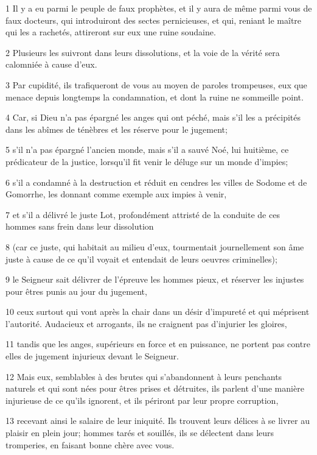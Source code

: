 \par 1 Il y a eu parmi le peuple de faux prophètes, et il y aura de même parmi vous de faux docteurs, qui introduiront des sectes pernicieuses, et qui, reniant le maître qui les a rachetés, attireront sur eux une ruine soudaine.
\par 2 Plusieurs les suivront dans leurs dissolutions, et la voie de la vérité sera calomniée à cause d'eux.
\par 3 Par cupidité, ils trafiqueront de vous au moyen de paroles trompeuses, eux que menace depuis longtemps la condamnation, et dont la ruine ne sommeille point.
\par 4 Car, si Dieu n'a pas épargné les anges qui ont péché, mais s'il les a précipités dans les abîmes de ténèbres et les réserve pour le jugement;
\par 5 s'il n'a pas épargné l'ancien monde, mais s'il a sauvé Noé, lui huitième, ce prédicateur de la justice, lorsqu'il fit venir le déluge sur un monde d'impies;
\par 6 s'il a condamné à la destruction et réduit en cendres les villes de Sodome et de Gomorrhe, les donnant comme exemple aux impies à venir,
\par 7 et s'il a délivré le juste Lot, profondément attristé de la conduite de ces hommes sans frein dans leur dissolution
\par 8 (car ce juste, qui habitait au milieu d'eux, tourmentait journellement son âme juste à cause de ce qu'il voyait et entendait de leurs oeuvres criminelles);
\par 9 le Seigneur sait délivrer de l'épreuve les hommes pieux, et réserver les injustes pour êtres punis au jour du jugement,
\par 10 ceux surtout qui vont après la chair dans un désir d'impureté et qui méprisent l'autorité. Audacieux et arrogants, ils ne craignent pas d'injurier les gloires,
\par 11 tandis que les anges, supérieurs en force et en puissance, ne portent pas contre elles de jugement injurieux devant le Seigneur.
\par 12 Mais eux, semblables à des brutes qui s'abandonnent à leurs penchants naturels et qui sont nées pour êtres prises et détruites, ils parlent d'une manière injurieuse de ce qu'ils ignorent, et ils périront par leur propre corruption,
\par 13 recevant ainsi le salaire de leur iniquité. Ils trouvent leurs délices à se livrer au plaisir en plein jour; hommes tarés et souillés, ils se délectent dans leurs tromperies, en faisant bonne chère avec vous.
